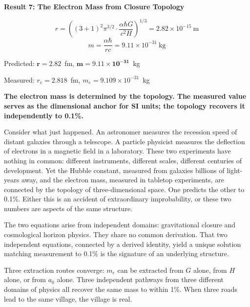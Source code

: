 \documentclass[aps,prd,preprint,superscriptaddress,showpacs,preprintnumbers,amsmath,amssymb,nofootinbib]{revtex4-2}
\begin{document}
\vspace{1.5em}
\noindent
\colorbox{resultgreen}{\parbox{\dimexpr\textwidth-2\fboxsep\relax}{%
\vspace{0.8em}
\centering
\textbf{\large Result 7: The Electron Mass from Closure Topology}

\vspace{0.5em}
\boldmath
\begin{equation}
r = \left( (3{+}1)^2 \pi^{3/2} \cdot \frac{\alpha \hbar G}{c^2 H} \right)^{1/3} = 2.82 \times 10^{-15}~\text{m}
\end{equation}
\begin{equation}
m = \frac{\alpha \hbar}{rc} = 9.11 \times 10^{-31}~\text{kg}
\end{equation}
\unboldmath

\vspace{0.3em}
Predicted: $\bm{r = 2.82}$~fm, $\bm{m = 9.11 \times 10^{-31}}$~kg

Measured: $r_e = 2.818$~fm, $m_e = 9.109 \times 10^{-31}$~kg

\textbf{The electron mass is determined by the topology. The measured value serves as the dimensional anchor for SI units; the topology recovers it independently to 0.1\%.}
\vspace{0.5em}
}}
\vspace{1cm}

Consider what just happened. An astronomer measures the recession speed of distant galaxies through a telescope. A particle physicist measures the deflection of electrons in a magnetic field in a laboratory. These two experiments have nothing in common: different instruments, different scales, different centuries of development. Yet the Hubble constant, measured from galaxies billions of light-years away, and the electron mass, measured in tabletop experiments, are connected by the topology of three-dimensional space. One predicts the other to 0.1\%. Either this is an accident of extraordinary improbability, or these two numbers are aspects of the same structure.

The two equations arise from independent domains: gravitational closure and cosmological horizon physics. They share no common derivation. That two independent equations, connected by a derived identity, yield a unique solution matching measurement to 0.1\% is the signature of an underlying structure.

Three extraction routes converge: $m_e$ can be extracted from $G$ alone, from $H$ alone, or from $a_0$ alone. Three independent pathways from three different domains of physics all recover the same mass to within 1\%. When three roads lead to the same village, the village is real.
\end{document}
